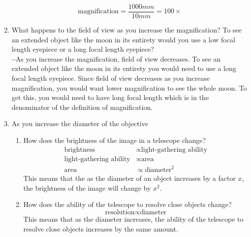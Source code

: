 \documentclass[12pt]{article}
\newcommand\mk{\textbf{--}}
\begin{document}
\begin{enumerate}
\begin{equation*}
                \text{magnification} = \frac{1000mm}{10mm} = \boxed{100\times}
            \end{equation*}
        \item What happens to the field of view as you increase the magnification? To see an extended object like the moon in its entirety would you use a low focal length eyepiece or a long focal length eyepiece?\\
            \mk{}As you increase the magnification, field of view decreases. To see an extended object like the moon in its entirety you would need to use a long focal length eyepiece. Since field of view decreases as you increase magnification, you would want lower magnification to see the whole moon. To get this, you would need to have long focal length which is in the denominator of the definition of magnification. 
        \item As you increase the diameter of the objective \begin{enumerate}
            \item How does the brightness of the image in a telescope change?
                \begin{align*}
                    \text{brightness} &\propto \text{light-gathering ability}\\
                    \text{light-gathering ability} &\propto \text{area}\\
                    \text{area} &\propto \text{diameter}^2
                \end{align*}
                This means that the as the diameter of an object increases by a factor $x$, the brightness of the image will change by $x^2$.
            \item How does the ability of the telescope to resolve close objects change?
                \begin{equation*}
                    \text{resolution} \propto \text{diameter} 
                \end{equation*}
                This means that as the diameter increases, the ability of the telescope to resolve close objects increases by the same amount.
        \end{enumerate}
    \end{enumerate}
\end{document}
